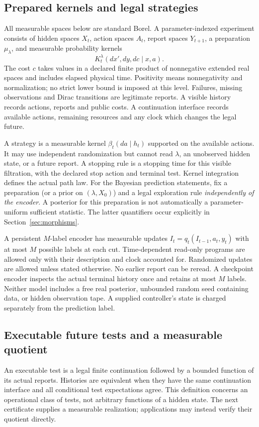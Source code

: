 \subsection{Prepared kernels and legal strategies}
All measurable spaces below are standard Borel. A parameter-indexed experiment consists of hidden spaces $X_t$, action spaces $A_t$, report spaces $Y_{t+1}$, a preparation $\mu_\lambda$, and measurable probability kernels
\begin{equation}\label{eq:raw}
 K_t^\lambda(dx',dy,dc\mid x,a).
\end{equation}
The cost $c$ takes values in a declared finite product of nonnegative extended real spaces and includes elapsed physical time. Positivity means nonnegativity and normalization; no strict lower bound is imposed at this level. Failures, missing observations and Dirac transitions are legitimate reports. A visible history records actions, reports and public costs. A continuation interface records available actions, remaining resources and any clock which changes the legal future.

A strategy is a measurable kernel $\beta_t(da\mid h_t)$ supported on the available actions. It may use independent randomization but cannot read $\lambda$, an unobserved hidden state, or a future report. A stopping rule is a stopping time for this visible filtration, with the declared stop action and terminal test. Kernel integration defines the actual path law. For the Bayesian prediction statements, fix a preparation (or a prior on $(\lambda,X_0)$) and a legal exploration rule \emph{independently of the encoder}. A posterior for this preparation is not automatically a parameter-uniform sufficient statistic. The latter quantifiers occur explicitly in Section~\ref{sec:morphisms}.

A persistent $M$-label encoder has measurable updates $I_t=q_t(I_{t-1},a_t,y_t)$ with at most $M$ possible labels at each cut. Time-dependent read-only programs are allowed only with their description and clock accounted for. Randomized updates are allowed unless stated otherwise. No earlier report can be reread. A checkpoint encoder inspects the actual terminal history once and retains at most $M$ labels. Neither model includes a free real posterior, unbounded random seed containing data, or hidden observation tape. A supplied controller's state is charged separately from the prediction label.

\subsection{Executable future tests and a measurable quotient}
An executable test is a legal finite continuation followed by a bounded function of its actual reports. Histories are equivalent when they have the same continuation interface and all conditional test expectations agree. This definition concerns an operational class of tests, not arbitrary functions of a hidden state. The next certificate supplies a measurable realization; applications may instead verify their quotient directly.

